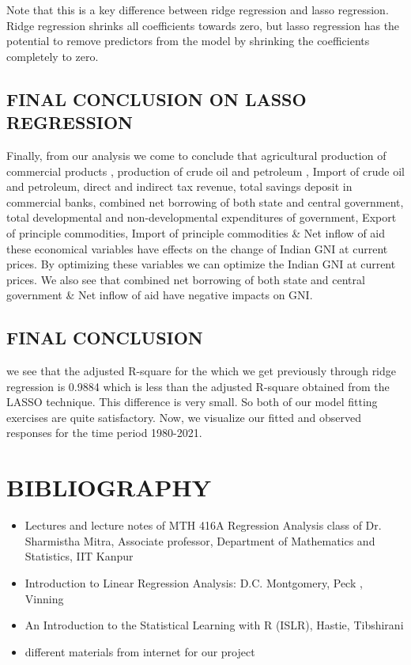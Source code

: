\documentclass[a4paper,12pt,twoside]{book}
\begin{document}
  Note that this is a key difference between ridge regression and lasso regression. Ridge regression shrinks all coefficients towards zero, but lasso regression has the potential to remove predictors from the model by shrinking the coefficients completely to zero.
\subsection*{FINAL CONCLUSION ON LASSO REGRESSION}
  Finally, from our analysis we come to conclude that agricultural production of commercial products , production of crude oil and petroleum , Import of crude oil and petroleum, direct and indirect tax revenue, total savings deposit in commercial banks, combined net borrowing of both state and central government, total developmental and non-developmental expenditures of government, Export of principle commodities, Import of principle commodities &  Net inflow of aid these economical variables have effects on the change of Indian GNI at current prices. By optimizing these variables we can optimize the Indian GNI at current prices. We also see that combined net borrowing of both state and central government & Net inflow of aid have negative impacts on GNI.\\
\subsection{FINAL CONCLUSION}
we see that the adjusted R-square for the which we get previously through ridge regression is 0.9884 which is less than the adjusted R-square obtained from the LASSO technique. This difference is very small. So both of our model fitting exercises are quite satisfactory.  
Now, we visualize our fitted and observed responses for the time period 1980-2021.
\newpage
\section*{BIBLIOGRAPHY}
\begin{itemize}
    \item Lectures and lecture notes of MTH 416A Regression Analysis class of Dr. Sharmistha Mitra, Associate professor, Department of Mathematics and Statistics, IIT Kanpur
    \item Introduction to Linear Regression Analysis: D.C. Montgomery, Peck , Vinning
    \item An Introduction to the Statistical Learning with R (ISLR), Hastie, Tibshirani
    \item different materials from internet for our project
\end{itemize}
\end{document}
